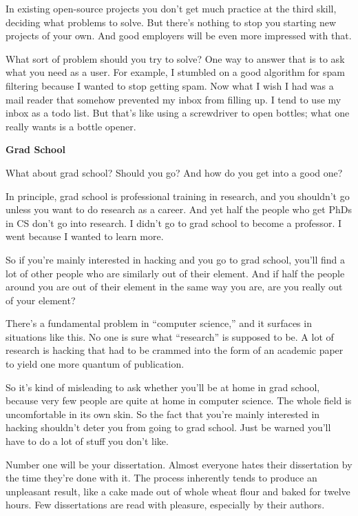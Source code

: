 In existing open-source projects you don't get much practice at the
third skill, deciding what problems to solve. But there's nothing to
stop you starting new projects of your own. And good employers will be
even more impressed with that.

What sort of problem should you try to solve? One way to answer that is
to ask what you need as a user. For example, I stumbled on a good
algorithm for spam filtering because I wanted to stop getting spam. Now
what I wish I had was a mail reader that somehow prevented my inbox from
filling up. I tend to use my inbox as a todo list. But that's like using
a screwdriver to open bottles; what one really wants is a bottle opener.

\textbf{Grad School}

What about grad school? Should you go? And how do you get into a good
one?

In principle, grad school is professional training in research, and you
shouldn't go unless you want to do research as a career. And yet half
the people who get PhDs in CS don't go into research. I didn't go to
grad school to become a professor. I went because I wanted to learn
more.

So if you're mainly interested in hacking and you go to grad school,
you'll find a lot of other people who are similarly out of their
element. And if half the people around you are out of their element in
the same way you are, are you really out of your element?

There's a fundamental problem in ``computer science,'' and it surfaces
in situations like this. No one is sure what ``research'' is supposed to
be. A lot of research is hacking that had to be crammed into the form of
an academic paper to yield one more quantum of publication.

So it's kind of misleading to ask whether you'll be at home in grad
school, because very few people are quite at home in computer science.
The whole field is uncomfortable in its own skin. So the fact that
you're mainly interested in hacking shouldn't deter you from going to
grad school. Just be warned you'll have to do a lot of stuff you don't
like.

Number one will be your dissertation. Almost everyone hates their
dissertation by the time they're done with it. The process inherently
tends to produce an unpleasant result, like a cake made out of whole
wheat flour and baked for twelve hours. Few dissertations are read with
pleasure, especially by their authors.

